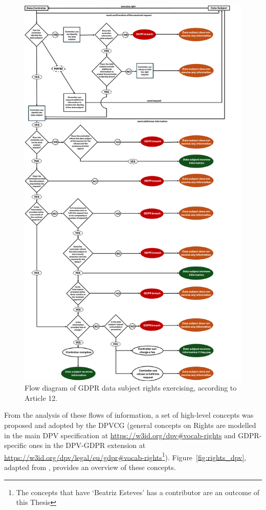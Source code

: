 \begin{figure}[htp]
    \centering
    \includegraphics[width=0.78\linewidth]{figures/chapter-4/GDPR-DSR.png}
    \caption{Flow diagram of GDPR data subject rights exercising, according to Article 12.}
    \label{fig:gdpr-rights}
\end{figure}

From the analysis of these flows of information, a set of high-level concepts was proposed and adopted by the DPVCG (general concepts on Rights are modelled in the main DPV specification at \url{https://w3id.org/dpv#vocab-rights} and GDPR-specific ones in the DPV-GDPR extension at \url{https://w3id.org/dpv/legal/eu/gdpr#vocab-rights}\footnote{The concepts that have `Beatriz Esteves' has a contributor are an outcome of this Thesis}).
Figure~\ref{fig:rights_dpv}, adapted from \cite{pandit_primer_2022}, provides an overview of these concepts.

